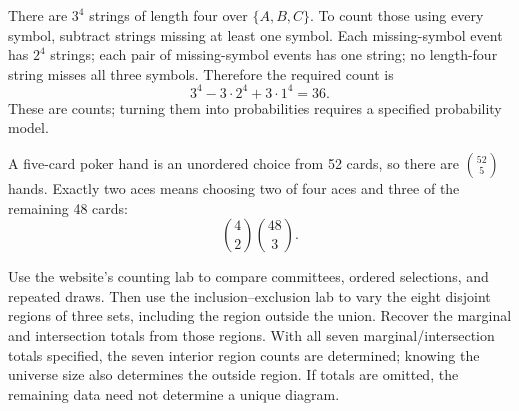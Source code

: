 \begin{example}
There are $3^4$ strings of length four over $\{A,B,C\}$.
To count those using every symbol, subtract strings missing at least
one symbol. Each missing-symbol event has $2^4$ strings; each pair of
missing-symbol events has one string; no length-four string misses
all three symbols. Therefore the required count is
\[
3^4-3\cdot2^4+3\cdot1^4=36.
\]
These are counts; turning them into probabilities requires a specified
probability model.
\end{example}

\begin{example}
A five-card poker hand is an unordered choice from 52 cards, so there are $\binom{52}{5}$ hands. Exactly two aces means choosing two of four aces and three of the remaining 48 cards:
\[
\binom42\binom{48}{3}.
\]
\end{example}

\begin{labbox}
Use the website's counting lab to compare committees, ordered selections,
and repeated draws. Then use the inclusion--exclusion lab to vary the eight
disjoint regions of three sets, including the region outside the union.
Recover the marginal and intersection totals from those regions. With
all seven marginal/intersection totals specified, the seven interior
region counts are determined; knowing the universe size also determines
the outside region. If totals are omitted, the remaining data need not
determine a unique diagram.
\end{labbox}

